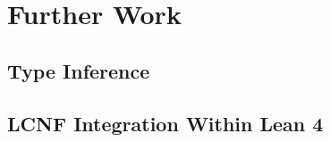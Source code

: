 \chapter{Further Work}\label{sec:furtherwork}

\section{Type Inference}

\section{LCNF Integration Within Lean 4}